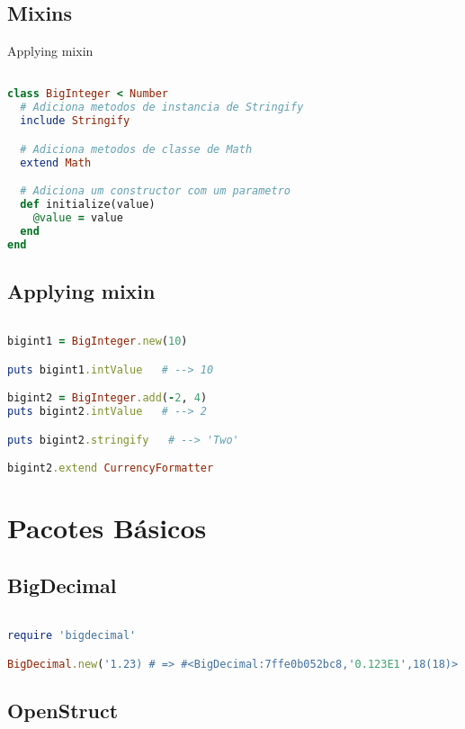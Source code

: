\documentclass[serif,mathserif]{article}
\begin{document}
\subsection{Mixins}

Applying mixin

\begin{lstlisting}[language=ruby]

class BigInteger < Number
  # Adiciona metodos de instancia de Stringify
  include Stringify

  # Adiciona metodos de classe de Math
  extend Math

  # Adiciona um constructor com um parametro
  def initialize(value)
    @value = value
  end
end
\end{lstlisting}

\subsection{Applying mixin}

\begin{lstlisting}[language=ruby]

bigint1 = BigInteger.new(10)

puts bigint1.intValue   # --> 10

bigint2 = BigInteger.add(-2, 4)
puts bigint2.intValue   # --> 2

puts bigint2.stringify   # --> 'Two'

bigint2.extend CurrencyFormatter
\end{lstlisting}

\section{Pacotes Básicos}

\subsection{BigDecimal}

\begin{lstlisting}[language=ruby]

require 'bigdecimal'

BigDecimal.new('1.23) # => #<BigDecimal:7ffe0b052bc8,'0.123E1',18(18)>
\end{lstlisting}

\subsection{OpenStruct}
\end{document}
